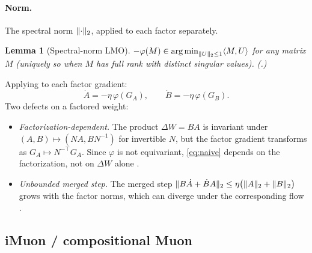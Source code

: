\documentclass[11pt]{article}
\DeclareMathOperator*{\argmin}{arg\,min}
\DeclarePairedDelimiter{\norm}{\lVert}{\rVert}
\newcommand{\DW}{\Delta W}
\newcommand{\polar}{\varphi}                 %
\theoremstyle{plain}
\newtheorem{lemma}{Lemma}
\theoremstyle{definition}
\theoremstyle{remark}
\begin{document}
\paragraph{Norm.} The spectral norm $\norm{\cdot}_2$, applied to each factor separately.
\begin{lemma}[Spectral-norm LMO]\label{lem:lmo}
$-\polar(M)\in\argmin_{\norm{U}_2\le1}\langle M,U\rangle$ for any matrix $M$ (uniquely so when $M$ has full rank with distinct singular values). \emph{(.)}
\end{lemma}
\noindent Applying  to each factor gradient:
\begin{equation}
  \dot A=-\eta\,\polar(G_A),\qquad \dot B=-\eta\,\polar(G_B).
  \label{eq:naive}
\end{equation}
Two defects on a factored weight:
\begin{itemize}[leftmargin=1.5em,itemsep=1pt,topsep=2pt]
  \item \emph{Factorization-dependent.} The product $\DW=BA$ is invariant under $(A,B)\mapsto(NA,BN^{-1})$ for invertible $N$, but the factor gradient transforms as $G_A\mapsto N^{-\top}G_A$. Since $\polar$ is not equivariant, \eqref{eq:naive} depends on the factorization, not on $\DW$ alone \cite{imuon}.
  \item \emph{Unbounded merged step.} The merged step
        $\norm{B\dot A+\dot B A}_2\le\eta\big(\norm{A}_2+\norm{B}_2\big)$
        grows with the factor norms, which can diverge under the corresponding flow \cite{kang_specgf}.
\end{itemize}

\subsection{iMuon / compositional Muon}
\label{sec:method-imuon}
\end{document}
